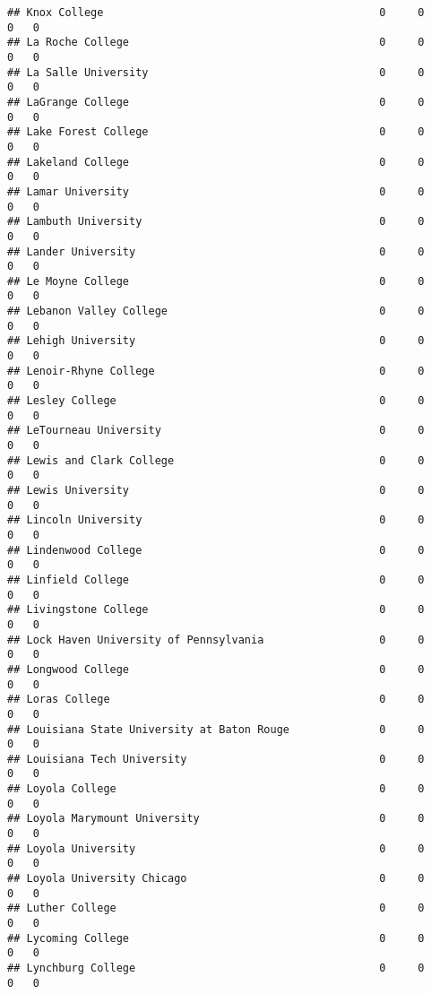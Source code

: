\documentclass[
]{article}
\begin{document}
\begin{verbatim}
## Knox College                                           0     0        0   0
## La Roche College                                       0     0        0   0
## La Salle University                                    0     0        0   0
## LaGrange College                                       0     0        0   0
## Lake Forest College                                    0     0        0   0
## Lakeland College                                       0     0        0   0
## Lamar University                                       0     0        0   0
## Lambuth University                                     0     0        0   0
## Lander University                                      0     0        0   0
## Le Moyne College                                       0     0        0   0
## Lebanon Valley College                                 0     0        0   0
## Lehigh University                                      0     0        0   0
## Lenoir-Rhyne College                                   0     0        0   0
## Lesley College                                         0     0        0   0
## LeTourneau University                                  0     0        0   0
## Lewis and Clark College                                0     0        0   0
## Lewis University                                       0     0        0   0
## Lincoln University                                     0     0        0   0
## Lindenwood College                                     0     0        0   0
## Linfield College                                       0     0        0   0
## Livingstone College                                    0     0        0   0
## Lock Haven University of Pennsylvania                  0     0        0   0
## Longwood College                                       0     0        0   0
## Loras College                                          0     0        0   0
## Louisiana State University at Baton Rouge              0     0        0   0
## Louisiana Tech University                              0     0        0   0
## Loyola College                                         0     0        0   0
## Loyola Marymount University                            0     0        0   0
## Loyola University                                      0     0        0   0
## Loyola University Chicago                              0     0        0   0
## Luther College                                         0     0        0   0
## Lycoming College                                       0     0        0   0
## Lynchburg College                                      0     0        0   0

\end{verbatim}
\end{document}
